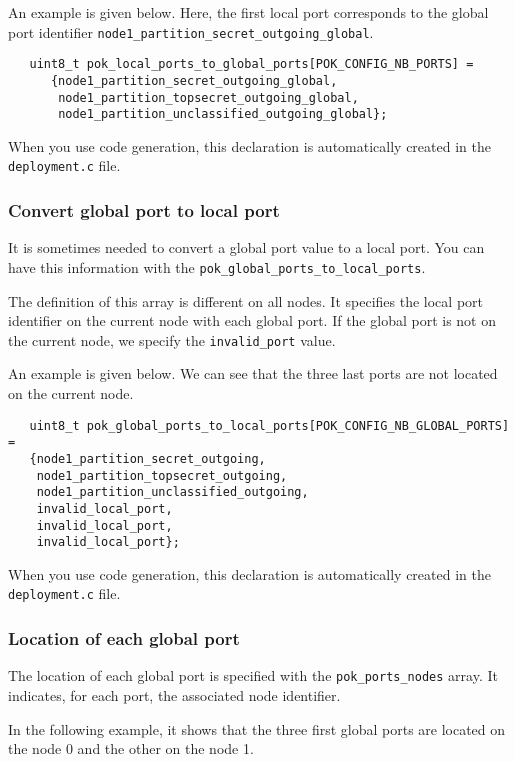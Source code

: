    An example is given below. Here, the first local port corresponds to the
   global port identifier \texttt{node1\_partition\_secret\_outgoing\_global}.

   \begin{verbatim}
   uint8_t pok_local_ports_to_global_ports[POK_CONFIG_NB_PORTS] =
      {node1_partition_secret_outgoing_global,
       node1_partition_topsecret_outgoing_global,
       node1_partition_unclassified_outgoing_global};
   \end{verbatim}

   When you use code generation, this declaration is
   automatically created in the \texttt{deployment.c} file.


   \subsubsection{Convert global port to local port}
   It is sometimes needed to convert a global port value to a local port. You
   can have this information with the \texttt{pok\_global\_ports\_to\_local\_ports}.
   
   The definition of this array is different on all nodes. It specifies the
   local port identifier on the current node with each global port. If the
   global port is not on the current node, we specify the \texttt{invalid\_port}
   value.

   An example is given below. We can see that the three last ports are not
   located on the current node.

   \begin{verbatim}
   uint8_t pok_global_ports_to_local_ports[POK_CONFIG_NB_GLOBAL_PORTS] =
   {node1_partition_secret_outgoing,
    node1_partition_topsecret_outgoing,
    node1_partition_unclassified_outgoing,
    invalid_local_port,
    invalid_local_port,
    invalid_local_port};
   \end{verbatim}

   When you use code generation, this declaration is
   automatically created in the \texttt{deployment.c} file.

   \subsubsection{Location of each global port}
   The location of each global port is specified with the
   \texttt{pok\_ports\_nodes} array. It indicates, for each port, the associated
   node identifier.

   In the following example, it shows that the three first global ports are
   located on the node 0 and the other on the node 1.

